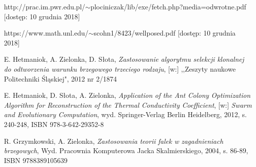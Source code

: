 \documentclass[twoside]{projektInzynierskiMS1}
\begin{document}
\begin{thebibliography}{12}
 http://prac.im.pwr.edu.pl/$\sim$plociniczak/lib/exe/fetch.php?media=odwrotne.pdf
[dostęp: 10 grudnia 2018]

 https://www.math.unl.edu/$\sim$scohn1/8423/wellposed.pdf
 [dostęp: 10 grudnia 2018]

E. Hetmaniok, A. Zielonka, D. Słota, \textit{Zastosowanie algorytmu selekcji klonalnej do odtworzenia warunku brzegowego trzeciego rodzaju}, [w:] ,,Zeszyty naukowe Politechniki Śląskiej", 2012 nr 2/1874

 E. Hetmaniok, D. Słota, A. Zielonka, \textit{Application of the Ant Colony Optimization Algorithm for Reconstruction of the Thermal Conductivity Coefficient}, [w:] \textit{Swarm and Evolutionary Computation}, wyd. Springer-Verlag Berlin Heidelberg, 2012,  s. 240-248, ISBN 978-3-642-29352-8

 R. Grzymkowski, A. Zielonka, \textit{Zastosowania teorii falek w zagadnieniach brzegowych}, Wyd. Pracownia Komputerowa Jacka Skalmierskiego, 2004, s. 86-89, ISBN 9788389105639


\end{thebibliography}
\end{document}
